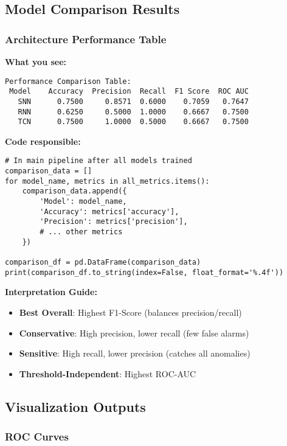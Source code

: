 \documentclass[12pt,a4paper]{article}
\begin{document}
\subsection{Model Comparison Results}

\subsubsection{Architecture Performance Table}

\textbf{What you see:}
\begin{lstlisting}
Performance Comparison Table:
 Model    Accuracy  Precision  Recall  F1 Score  ROC AUC
   SNN      0.7500     0.8571  0.6000    0.7059   0.7647
   RNN      0.6250     0.5000  1.0000    0.6667   0.7500
   TCN      0.7500     1.0000  0.5000    0.6667   0.7500
\end{lstlisting}

\textbf{Code responsible:}
\begin{lstlisting}
# In main pipeline after all models trained
comparison_data = []
for model_name, metrics in all_metrics.items():
    comparison_data.append({
        'Model': model_name,
        'Accuracy': metrics['accuracy'],
        'Precision': metrics['precision'],
        # ... other metrics
    })

comparison_df = pd.DataFrame(comparison_data)
print(comparison_df.to_string(index=False, float_format='%.4f'))
\end{lstlisting}

\textbf{Interpretation Guide:}
\begin{itemize}
    \item \textbf{Best Overall}: Highest F1-Score (balances precision/recall)
    \item \textbf{Conservative}: High precision, lower recall (few false alarms)
    \item \textbf{Sensitive}: High recall, lower precision (catches all anomalies)
    \item \textbf{Threshold-Independent}: Highest ROC-AUC
\end{itemize}

\subsection{Visualization Outputs}

\subsubsection{ROC Curves}
\end{document}
